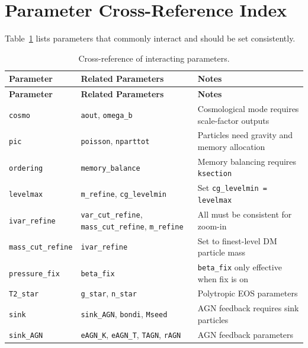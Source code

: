 \section{Parameter Cross-Reference Index}
\label{sec:crossref}

Table~\ref{tab:crossref} lists parameters that commonly interact and
should be set consistently.

\begin{longtable}{@{}p{4cm}p{4.5cm}p{6.5cm}@{}}
\caption{Cross-reference of interacting parameters.}
\label{tab:crossref}\\
\toprule
\textbf{Parameter} & \textbf{Related Parameters} & \textbf{Notes} \\
\midrule
\endfirsthead
\toprule
\textbf{Parameter} & \textbf{Related Parameters} & \textbf{Notes} \\
\midrule
\endhead
\bottomrule
\endfoot
\texttt{cosmo}
  & \texttt{aout}, \texttt{omega\_b}
  & Cosmological mode requires scale-factor outputs \\
\addlinespace
\texttt{pic}
  & \texttt{poisson}, \texttt{nparttot}
  & Particles need gravity and memory allocation \\
\addlinespace
\texttt{ordering}
  & \texttt{memory\_balance}
  & Memory balancing requires \texttt{ksection} \\
\addlinespace
\texttt{levelmax}
  & \texttt{m\_refine}, \texttt{cg\_levelmin}
  & Set \texttt{cg\_levelmin = levelmax} \\
\addlinespace
\texttt{ivar\_refine}
  & \texttt{var\_cut\_refine}, \texttt{mass\_cut\_refine}, \texttt{m\_refine}
  & All must be consistent for zoom-in \\
\addlinespace
\texttt{mass\_cut\_refine}
  & \texttt{ivar\_refine}
  & Set to finest-level DM particle mass \\
\addlinespace
\texttt{pressure\_fix}
  & \texttt{beta\_fix}
  & \texttt{beta\_fix} only effective when fix is on \\
\addlinespace
\texttt{T2\_star}
  & \texttt{g\_star}, \texttt{n\_star}
  & Polytropic EOS parameters \\
\addlinespace
\texttt{sink}
  & \texttt{sink\_AGN}, \texttt{bondi}, \texttt{Mseed}
  & AGN feedback requires sink particles \\
\addlinespace
\texttt{sink\_AGN}
  & \texttt{eAGN\_K}, \texttt{eAGN\_T}, \texttt{TAGN}, \texttt{rAGN}
  & AGN feedback parameters \\

\end{longtable}
